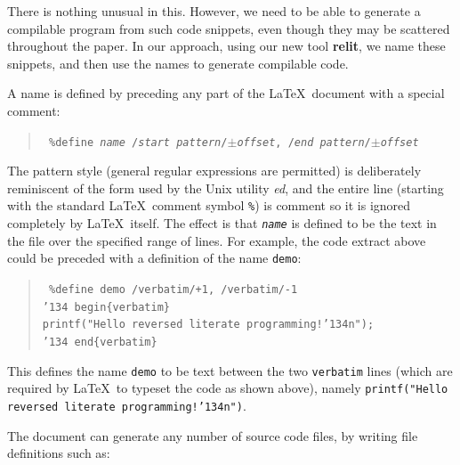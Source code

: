 \documentclass[12pt]{article}
\def\name#1{\textbf{#1}}
\begin{document}
There is nothing unusual in this. However, we need to be able to generate a compilable program from such code snippets, even though they may be scattered throughout the paper. In our approach, using our new tool \name{relit}, we name these snippets, and then use the names to generate compilable code.

A name is defined by preceding any part of the \LaTeX\ document with a special comment: 

\begin{verse}\tt
\%{}define \emph{name} /\emph{start pattern}/$\pm$\emph{offset}, /\emph{end pattern}/$\pm$\emph{offset}
\end{verse} 

The pattern style (general regular expressions are permitted) is deliberately reminiscent of the form used by the Unix utility \emph{ed}, and the entire line (starting with the standard \LaTeX\ comment symbol \texttt{\%}) is comment so it is ignored completely by \LaTeX\ itself. 
The effect is that \texttt{\emph{name}} is defined to be the text in the file over the specified range of lines. For example, the code extract above could be preceded with a definition of the name \texttt{demo}:

\begin{verse}\tt %
\%{}define demo /verbatim/+1, /verbatim/-1\\
\char'134 begin\{verbatim\}\\
printf("Hello reversed literate programming!\char'134n");\\
\char'134 end\{verbatim\}
\end{verse}

\def\ignore#1{}
\ignore{
\begin{verbatim}
printf("Hello world!\n");
\end{verbatim}
}

This defines the name \texttt{demo} to be text between the two \texttt{verbatim} lines (which are required by \LaTeX\ to typeset the code as shown above), namely \texttt{printf("Hello reversed literate programming!\char'134n")}.

The document can generate any number of source code files, by writing file definitions such as:
\end{document}
